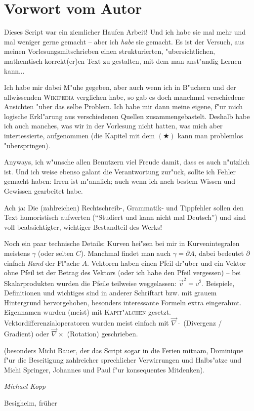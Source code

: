 \chapter{Vorwort vom Autor}
\label{kap_vorwort}

Dieses Script war ein ziemlicher Haufen Arbeit! Und ich habe sie mal
mehr und mal weniger gerne gemacht -- aber ich \emph{habe} sie
gemacht.
Es ist der Versuch, aus meinen Vorlesungsmitschrieben einen
strukturierten, "ubersichtlichen, mathemtisch korrekt(er)en Text zu
gestalten, mit dem man anst"andig Lernen kann...

Ich habe mir dabei M"uhe gegeben, aber auch wenn ich in B"uchern und
der allwissenden \textsc{Wikipedia} verglichen habe, so gab es doch
manchmal verschiedene Ansichten "uber das selbe Problem. Ich habe mir
dann meine eigene, f"ur mich logische Erkl"arung aus verschiedenen
Quellen zusammengebastelt. Deshalb habe ich auch manches, was wir in
der Vorlesung nicht hatten, was mich aber intertessierte, aufgenommen
(die Kapitel mit dem $(\bigstar)$ kann man problemlos "uberspringen).


Anyways, ich w"unsche allen Benutzern viel Freude damit, dass es auch
n"utzlich ist. Und ich weise ebenso galant die Verantwortung zur"uck,
sollte ich Fehler gemacht haben: Irren ist m"annlich; auch wenn ich
nach bestem Wissen und Gewissen gearbeitet habe.

Ach ja: Die (zahlreichen) Rechtschreib-, Grammatik- und Tippfehler
sollen den Text humoristisch aufwerten ("`Studiert und kann nicht mal
Deutsch"') und sind voll beabsichtigter,  wichtiger Bestandteil des
Werks!

\abs
Noch ein paar technische Details: Kurven hei"sen bei mir in
Kurvenintegralen meistens $\gamma$ (oder selten $C$). Manchmal findet
man auch $\gamma = \partial A$, dabei bedeutet $\partial$ einfach
\emph{Rand} der Fl"ache $A$. Vektoren haben einen Pfeil dr"uber und
ein Vektor ohne Pfeil ist der Betrag des Vektors (oder ich habe den
Pfeil vergessen) -- bei Skalarprodukten wurden die Pfeile teilweise
weggelassen: ${\vec v}^2 = v^2$. Beispiele, Definitionen und wichtiges
sind in anderer Schriftart bzw. mit grauem Hintergrund hervorgehoben,
besonders interessante Formeln extra eingerahmt. Eigennamen wurden
(meist) mit \textsc{Kapit"alchen}
gesetzt. Vektordifferenzialoperatoren wurden meist einfach mit $\vec \nabla
\cdot$ (Divergenz / Gradient) oder $\vec \nabla \times$ (Rotation)
geschrieben.

 (besonders
Michi Bauer, der das Script sogar in die Ferien mitnam, Dominique f"ur
die Beseitigung zahlreicher sprechlicher Verwirrungen und Halbs"atze
und Michi Springer, Johannes und Paul f"ur konsequentes Mitdenken).

\vfill
\hfill \textit{Michael Kopp}

\hfill Besigheim, früher %


















